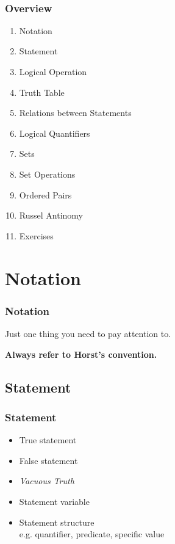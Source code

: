 \documentclass[12pt, t]{beamer}
\renewcommand{\emph}[1]{{\color{Turquoise3}\textsl{#1}}}
\begin{document}
\begin{frame}
    \
    \frametitle{Overview}
    \begin{enumerate}
        \item Notation
        \item Statement
        \item Logical Operation
        \item Truth Table
        \item Relations between Statements
        \item Logical Quantifiers
        \item Sets
        \item Set Operations
        \item Ordered Pairs
        \item Russel Antinomy
        \item Exercises
    \end{enumerate}
\end{frame}

\section{Notation}
\begin{frame}
    \frametitle{Notation}
    Just one thing you need to pay attention to.\\

    \begin{center}
        \textbf{Always refer to Horst's convention.}
    \end{center}

\end{frame}

\subsection{Statement}
\begin{frame}
    \frametitle{Statement}
    \begin{itemize}
        \item True statement
        \item False statement
        \item \emph{Vacuous Truth}
        \item Statement variable
        \item Statement structure \\
              e.g. quantifier, predicate, specific value
    \end{itemize}
\end{frame}
\end{document}
